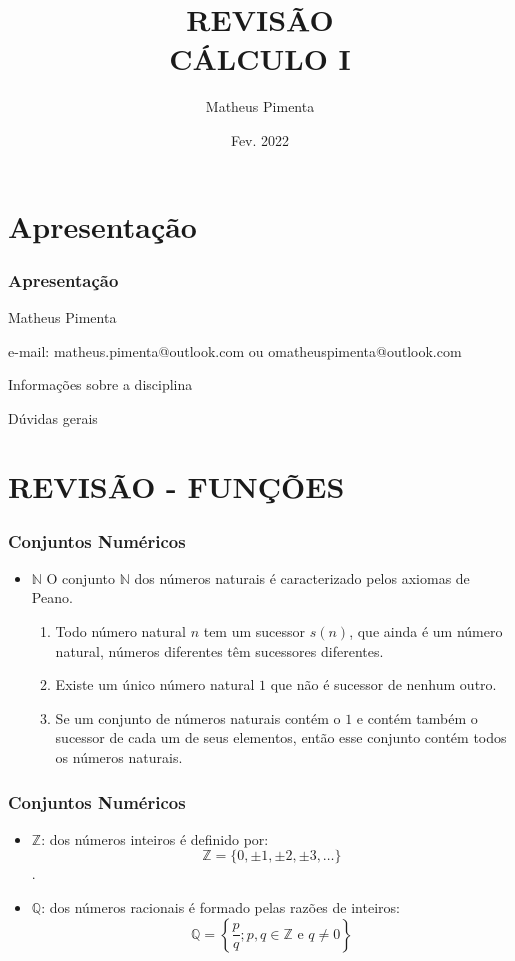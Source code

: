 \documentclass[hyperref={pdfpagelabels=false}]{beamer}
\title{REVISÃO \\ CÁLCULO I}
\author[Matheus Pimenta]{Matheus Pimenta}
\institute[UEL]{\normalsize Universidade Estadual de Londrina \\
	Londrina
}
\date{Fev. 2022}
\begin{document}
	
\begin{frame}
\titlepage
\end{frame} 




\section{Apresentação} 


\begin{frame}
\frametitle{Apresentação} 

Matheus Pimenta \pause

e-mail: matheus.pimenta@outlook.com ou omatheuspimenta@outlook.com \pause

Informações sobre a disciplina \pause

Dúvidas gerais


\end{frame}

\section{REVISÃO - FUNÇÕES}

\begin{frame}
\frametitle{Conjuntos Numéricos}
\begin{itemize}
 \item $\mathbb{N}$ O conjunto $\mathbb{N}$	dos números naturais é caracterizado pelos axiomas de Peano.

    \begin{enumerate}
        \item Todo número natural $n$ tem um sucessor $s(n)$, que ainda é um número natural, números diferentes têm sucessores diferentes. \pause
        \item Existe um único número natural $1$ que não é sucessor de nenhum outro. \pause
        \item Se um conjunto de números naturais contém o $1$ e contém também o sucessor de cada um de seus elementos, então esse conjunto contém todos os números naturais. \pause
    \end{enumerate}

\end{itemize}

\end{frame}

\begin{frame}
\frametitle{Conjuntos Numéricos}

\begin{itemize}
 \item $\mathbb{Z}$: \pause dos números inteiros é definido por: $$\mathbb{Z} = \{ 0, \pm 1, \pm 2, \pm 3, \dots \}$$. \pause
 \item $\mathbb{Q}$: \pause dos números racionais é formado pelas razões de inteiros: $$ \mathbb{Q} = \left\{ \frac{p}{q} ; p,q \in \mathbb{Z} \text{ e } q \neq 0 \right\}$$
\end{itemize}

\end{frame}
\end{document}
